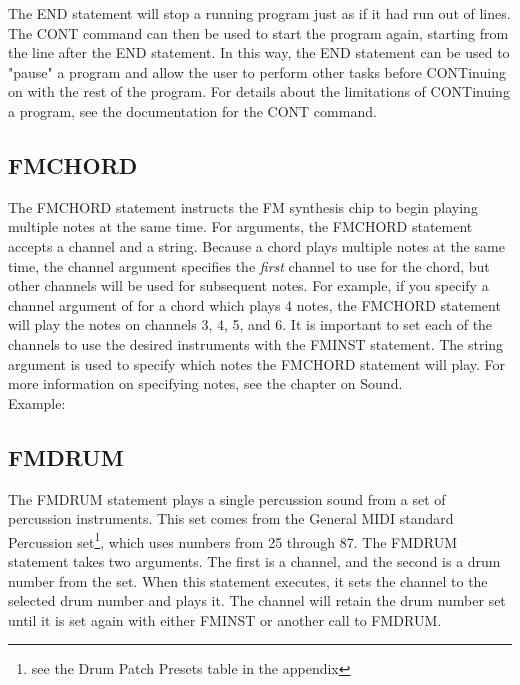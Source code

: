 The {\ttfamily END} statement will stop a running program just as if it had run
out of lines.  The {\ttfamily CONT} command can then be used to start the
program again, starting from the line after the {\ttfamily END} statement.  In
this way, the {\ttfamily END} statement can be used to "pause" a program and
allow the user to perform other tasks before {\ttfamily CONT}inuing on with the
rest of the program.  For details about the limitations of {\ttfamily
CONT}inuing a program, see the documentation for the {\ttfamily CONT}
command.\\

\subsection{FMCHORD}

The {\ttfamily FMCHORD} statement instructs the FM synthesis chip to begin
playing multiple notes at the same time.  For arguments, the {\ttfamily
FMCHORD} statement accepts a channel and a string.  Because a chord plays
multiple notes at the same time, the channel argument specifies the
\emph{first} channel to use for the chord, but other channels will be used for
subsequent notes.  For example, if you specify a channel argument of {} for a chord which plays 4 notes, the {\ttfamily FMCHORD} statement will play
the notes on channels 3, 4, 5, and 6.  It is important to set each of the
channels to use the desired instruments with the {\ttfamily FMINST} statement.
The string argument is used to specify which notes the {\ttfamily FMCHORD}
statement will play.  For more information on specifying notes, see the chapter
on Sound.\\

Example:\\


\subsection{FMDRUM}

The {\ttfamily FMDRUM} statement plays a single percussion sound from a set of
percussion instruments.  This set comes from the General MIDI standard
Percussion set\footnote{see the Drum Patch Presets table in the appendix},
which uses numbers from 25 through 87.  The {\ttfamily FMDRUM} statement takes
two arguments.  The first is a channel, and the second is a drum number from
the set.  When this statement executes, it sets the channel to the selected
drum number and plays it.  The channel will retain the drum number set until it
is set again with either {\ttfamily FMINST} or another call to {\ttfamily
FMDRUM}.\\

